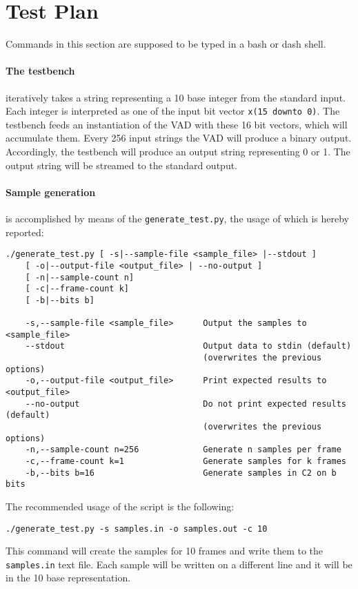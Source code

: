 \section{Test Plan}
Commands in this section are supposed to be typed in a bash or dash shell.

\paragraph{The testbench} iteratively takes a string representing a 10 base
integer from the standard input. Each integer is interpreted
as one of the input bit vector \texttt{x(15 downto 0)}. The testbench feeds an
instantiation of the VAD with these 16 bit vectors, which will accumulate them.
Every 256 input strings the VAD will produce a binary output. Accordingly,
the testbench will produce an output string representing 0 or 1. The output
string will be streamed to the standard output.

\paragraph{Sample generation} is accomplished by means of the
\texttt{generate\_test.py}, the usage of which is hereby reported:
\footnotesize{
\begin{verbatim}
./generate_test.py [ -s|--sample-file <sample_file> |--stdout ]
    [ -o|--output-file <output_file> | --no-output ]
    [ -n|--sample-count n]
    [ -c|--frame-count k]
    [ -b|--bits b]

    -s,--sample-file <sample_file>      Output the samples to <sample_file>
    --stdout                            Output data to stdin (default)
                                        (overwrites the previous options)
    -o,--output-file <output_file>      Print expected results to <output_file>
    --no-output                         Do not print expected results (default)
                                        (overwrites the previous options)
    -n,--sample-count n=256             Generate n samples per frame
    -c,--frame-count k=1                Generate samples for k frames
    -b,--bits b=16                      Generate samples in C2 on b bits
\end{verbatim}
}

The recommended usage of the script is the following:
\begin{verbatim}
./generate_test.py -s samples.in -o samples.out -c 10
\end{verbatim}
This command will create the samples for 10 frames and write them to the
\texttt{samples.in} text file. Each sample will be written on a different line
and it will be in the 10 base representation.

